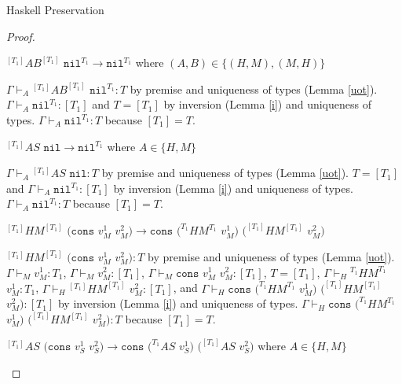 \begin{theorem}{Haskell Preservation}
\begin{proof}

\begin{case}
$^{[T_{1}]}AB^{[T_{1}]}$ $\mathtt{nil}^{T_{1}}\rightarrow\mathtt{nil}^{T_{1}}$ where $(A,B)\in\lbrace(H,M),(M,H)\rbrace$

$\Gamma\vdash_{A}{^{[T_{1}]}A}B^{[T_{1}]}$ $\mathtt{nil}^{T_{1}}:T$ by premise and uniqueness of types (Lemma \ref{uot}).  $\Gamma\vdash_{A}\mathtt{nil}^{T_{1}}:[T_{1}]$ and $T=[T_{1}]$ by inversion (Lemma \ref{i}) and uniqueness of types.  $\Gamma\vdash_{A}\mathtt{nil}^{T_{1}}:T$ because $[T_{1}]=T$.
\end{case}


\begin{case}
$^{[T_{1}]}AS$ $\mathtt{nil}\rightarrow\mathtt{nil}^{T_{1}}$ where $A\in\lbrace H,M\rbrace$

$\Gamma\vdash_{A}{^{[T_{1}]}A}S$ $\mathtt{nil}:T$ by premise and uniqueness of types (Lemma \ref{uot}).  $T=[T_{1}]$ and $\Gamma\vdash_{A}\mathtt{nil}^{T_{1}}:[T_{1}]$ by inversion (Lemma \ref{i}) and uniqueness of types.  $\Gamma\vdash_{A}\mathtt{nil}^{T_{1}}:T$ because $[T_{1}]=T$.
\end{case}


\begin{case}
$^{[T_{1}]}HM^{[T_{1}]}$ $(\mathtt{cons}$ $v_{M}^{1}$ $v_{M}^{2})\rightarrow\mathtt{cons}$ $(^{T_{1}}HM^{T_{1}}$ $v_{M}^{1})$ $(^{[T_{1}]}HM^{[T_{1}]}$ $v_{M}^{2})$

$^{[T_{1}]}HM^{[T_{1}]}$ $(\mathtt{cons}$ $v_{M}^{1}$ $v_{M}^{2}):T$ by premise and uniqueness of types (Lemma \ref{uot}).  $\Gamma\vdash_{M}v_{M}^{1}:T_{1}$, $\Gamma\vdash_{M}v_{M}^{2}:[T_{1}]$, $\Gamma\vdash_{M}\mathtt{cons}$ $v_{M}^{1}$ $v_{M}^{2}:[T_{1}]$, $T=[T_{1}]$, $\Gamma\vdash_{H}{^{T_{1}}H}M^{T_{1}}$ $v_{M}^{1}:T_{1}$, $\Gamma\vdash_{H}{^{[T_{1}]}H}M^{[T_{1}]}$ $v_{M}^{2}:[T_{1}]$, and $\Gamma\vdash_{H}\mathtt{cons}$ $(^{T_{1}}HM^{T_{1}}$ $v_{M}^{1})$ $(^{[T_{1}]}HM^{[T_{1}]}$ $v_{M}^{2}):[T_{1}]$ by inversion (Lemma \ref{i}) and uniqueness of types.  $\Gamma\vdash_{H}\mathtt{cons}$ $(^{T_{1}}HM^{T_{1}}$ $v_{M}^{1})$ $(^{[T_{1}]}HM^{[T_{1}]}$ $v_{M}^{2}):T$ because $[T_{1}]=T$.
\end{case}


\begin{case}
$^{[T_{1}]}AS$ $(\mathtt{cons}$ $v_{S}^{1}$ $v_{S}^{2})\rightarrow\mathtt{cons}$ $(^{T_{1}}AS$ $v_{S}^{1})$ $(^{[T_{1}]}AS$ $v_{S}^{2})$ where $A\in\lbrace H,M\rbrace$


\end{case}
\end{proof}
\end{theorem}
